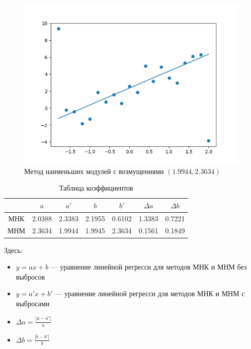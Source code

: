 \documentclass[12pt,a4paper]{article}
\begin{document}
	\begin{figure}[htbp!]
		\begin{center}
			\includegraphics[width = 1\linewidth]{graphics/lab6_la_outliners}
			\caption{Метод наименьших модулей с возмущениями
				\( (1.9944, 2.3634) \)}
		\end{center}
	\end{figure}

	\clearpage

	\begin{table}[htbp]
		\centering
		\begin{tabular}{ |c|c|c|c|c|c|c| }
			\hline
			& \( a \)  & \( a' \) & \( b \) & \( b' \) & \( \Delta a \) & \( \Delta b \) \\
			\hline
			МНК & 2.0388 & 2.3383 & 2.1955 & 0.6102 & 1.3383 & 0.7221 \\ \hline
			МНМ & 2.3634 & 1.9944  & 1.9945 & 2.3634 & 0.1561 & 0.1849 \\ \hline
		\end{tabular}
		\caption{Таблица коэффициентов}
	\end{table}

	Здесь:

	\begin{itemize}
		\item \( y = ax + b \) — уравнение линейной регресси для методов МНК и
			МНМ без выбросов
		\item \( y = a'x + b' \) — уравнение линейной регресси для методов МНК и
			МНМ с выбросами
		\item \( \Delta a = \frac{|a - a'|}{a} \)
		\item \( \Delta b = \frac{|b - b'|}{b} \)
	\end{itemize}
\end{document}
